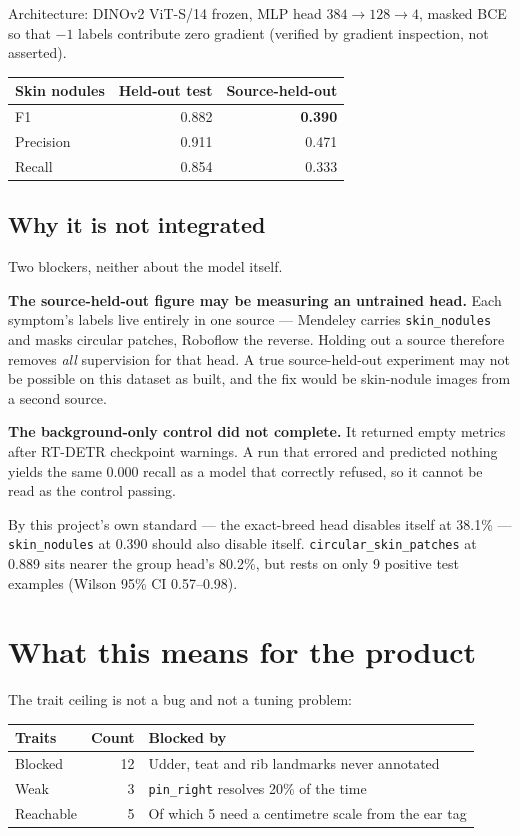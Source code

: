 \documentclass[11pt,a4paper]{article}
\newcommand{\good}[1]{{\color{measured}\textbf{#1}}}
\newcommand{\bad}[1]{{\color{invented}\textbf{#1}}}
\begin{document}
Architecture: DINOv2 ViT-S/14 frozen, MLP head $384 \to 128 \to 4$, masked BCE
so that $-1$ labels contribute zero gradient (verified by gradient inspection,
not asserted).

\begin{tabular}{@{}lrr@{}}
\toprule
\textbf{Skin nodules} & \textbf{Held-out test} & \good{Source-held-out} \\
\midrule
F1 & 0.882 & \bad{0.390} \\
Precision & 0.911 & 0.471 \\
Recall & 0.854 & 0.333 \\
\bottomrule
\end{tabular}

\subsection*{Why it is not integrated}

Two blockers, neither about the model itself.

\textbf{The source-held-out figure may be measuring an untrained head.} Each
symptom's labels live entirely in one source --- Mendeley carries
\texttt{skin\_nodules} and masks circular patches, Roboflow the reverse. Holding
out a source therefore removes \emph{all} supervision for that head. A true
source-held-out experiment may not be possible on this dataset as built, and
the fix would be skin-nodule images from a second source.

\textbf{The background-only control did not complete.} It returned empty
metrics after RT-DETR checkpoint warnings. A run that errored and predicted
nothing yields the same 0.000 recall as a model that correctly refused, so it
cannot be read as the control passing.

By this project's own standard --- the exact-breed head disables itself at
38.1\% --- \texttt{skin\_nodules} at 0.390 should also disable itself.
\texttt{circular\_skin\_patches} at 0.889 sits nearer the group head's 80.2\%,
but rests on only 9 positive test examples (Wilson 95\% CI 0.57--0.98).

\section{What this means for the product}

The trait ceiling is not a bug and not a tuning problem:

\begin{tabular}{@{}lrp{7.4cm}@{}}
\toprule
\textbf{Traits} & \textbf{Count} & \textbf{Blocked by} \\
\midrule
Blocked & 12 & Udder, teat and rib landmarks never annotated \\
Weak & 3 & \texttt{pin\_right} resolves 20\% of the time \\
Reachable & 5 & Of which 5 need a centimetre scale from the ear tag \\
\bottomrule
\end{tabular}
\end{document}
